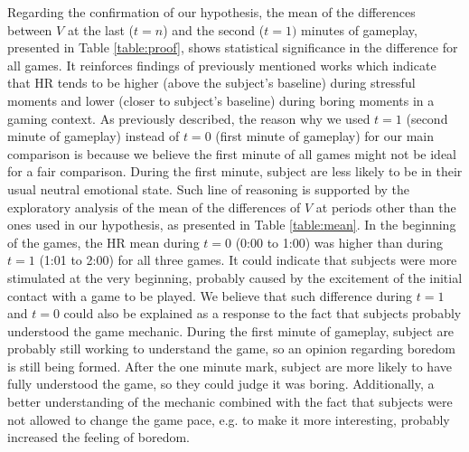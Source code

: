 Regarding the confirmation of our hypothesis, the mean of the differences between $V$ at the last ($t=n$) and the second ($t=1)$ minutes of gameplay, presented in Table \ref{table:proof}, shows statistical significance in the difference for all games. It reinforces findings of previously mentioned works \parencite{vandeput2009heart, garde2002effects, bousefsaf2013remote, rodriguez2015vr, yamakoshi2007preliminary} which indicate that HR tends to be higher (above the subject's baseline) during stressful moments and lower (closer to subject's baseline) during boring moments in a gaming context. As previously described, the reason why we used $t=1$ (second minute of gameplay) instead of $t=0$ (first minute of gameplay) for our main comparison is because we believe the first minute of all games might not be ideal for a fair comparison. During the first minute, subject are less likely to be in their usual neutral emotional state. Such line of reasoning is supported by the exploratory analysis of the mean of the differences of $V$ at periods other than the ones used in our hypothesis, as presented in Table \ref{table:mean}. In the beginning of the games, the HR mean during $t=0$ (0:00 to 1:00) was higher than during $t=1$ (1:01 to 2:00) for all three games. It could indicate that subjects were more stimulated at the very beginning, probably caused by the excitement of the initial contact with a game to be played. We believe that such difference during $t=1$ and $t=0$ could also be explained as a response to the fact that subjects probably understood the game mechanic. During the first minute of gameplay, subject are probably still working to understand the game, so an opinion regarding boredom is still being formed. After the one minute mark, subject are more likely to have fully understood the game, so they could judge it was boring. Additionally, a better understanding of the mechanic combined with the fact that subjects were not allowed to change the game pace, e.g. to make it more interesting, probably increased the feeling of boredom.


